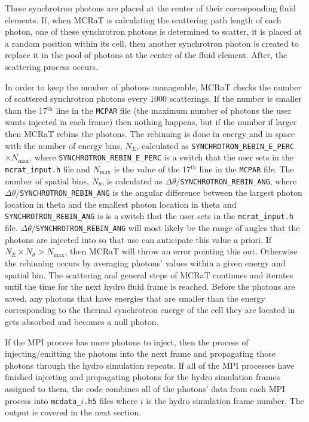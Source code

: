 \documentclass[12pt,a4paper]{article}
\begin{document}
These synchrotron photons are placed at the center of their corresponding fluid elements. If, when MCRaT is calculating the scattering path length of each photon, one of these synchrotron photons is determined to scatter, it is placed at a random position within its cell, then another synchrotron photon is created to replace it in the pool of photons at the center of the fluid element. After, the scattering process occurs.

In order to keep the number of photons manageable, MCRaT checks the number of scattered synchrotron photons every 1000 scatterings. If the number is smaller than the 17$^\textrm{th}$ line in the \texttt{MCPAR} file (the maximum number of photons the user wants injected in each frame) then nothing happens, but if the number if larger then MCRaT rebins the photons. The rebinning is done in energy and in space with the number of energy bins, $N_E$, calculated as \texttt{SYNCHROTRON\_REBIN\_E\_PERC}$\times N_\mathrm{max}$, where \texttt{SYNCHROTRON\_REBIN\_E\_PERC} is a switch that the user sets in the \texttt{mcrat\_input.h} file and $N_\mathrm{max}$ is the value of the 17$^\textrm{th}$ line in the \texttt{MCPAR} file. The number of spatial bins, $N_\theta$, is calculated as $\Delta \theta/$\texttt{SYNCHROTRON\_REBIN\_ANG}, where $\Delta \theta/$\texttt{SYNCHROTRON\_REBIN\_ANG} is the angular difference between the largest photon location in theta and the smallest photon location in theta and \texttt{SYNCHROTRON\_REBIN\_ANG} is is a switch that the user sets in the \texttt{mcrat\_input.h} file. $\Delta \theta/$\texttt{SYNCHROTRON\_REBIN\_ANG} will most likely be the range of angles that the photons are injected into so that use can anticipate this value a priori. If $N_E\times N_\theta>N_\mathrm{max}$, then MCRaT will throw an error pointing this out. Otherwise the rebinning occurs by averaging photons' values within a given energy and spatial bin. The scattering and general steps of MCRaT continues and iterates until the time for the next hydro fluid frame is reached. Before the photons are saved, any photons that have energies that are smaller than the energy corresponding to the thermal synchrotron energy of the cell they are located in gets absorbed and becomes a null photon. 

If the MPI process has more photons to inject, then the process of injecting/emitting the photons into the next frame and propagating those photons through the hydro simulation repeats. If all of the MPI processes have finished injecting and propagating photons for the hydro simulation frames assigned to them, the code combines all of the photons' data from each MPI process into \texttt{mcdata\_$i$.h5} files where $i$ is the hydro simulation frame number. The output is covered in the next section.
\end{document}
